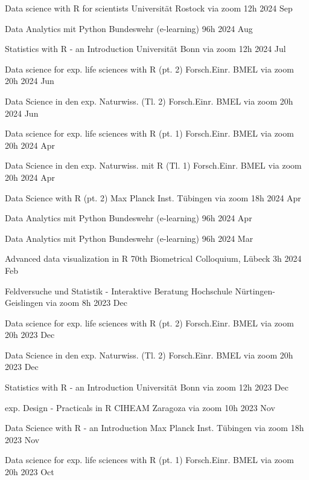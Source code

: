 \documentclass[11pt,a4paper,]{awesome-cv}
\begin{document}
\begin{cvhonors} 
\cvhonor
{Data science with R for scientists  }
{Universität Rostock via zoom}
{12h}
{2024 Sep  }

\cvhonor
{Data Analytics mit Python  }
{Bundeswehr (e-learning)}
{96h}
{2024 Aug  }

\cvhonor
{Statistics with R - an Introduction  }
{Universität Bonn via zoom}
{12h}
{2024 Jul  }

\cvhonor
{Data science for exp. life sciences with R (pt. 2)  }
{Forsch.Einr. BMEL via zoom}
{20h}
{2024 Jun  }

\cvhonor
{Data Science in den exp. Naturwiss. (Tl. 2)  }
{Forsch.Einr. BMEL via zoom}
{20h}
{2024 Jun  }

\cvhonor
{Data science for exp. life sciences with R (pt. 1)  }
{Forsch.Einr. BMEL via zoom}
{20h}
{2024 Apr  }

\cvhonor
{Data Science in den exp. Naturwiss. mit R (Tl. 1)  }
{Forsch.Einr. BMEL via zoom}
{20h}
{2024 Apr  }

\cvhonor
{Data Science with R (pt. 2)  }
{Max Planck Inst. Tübingen via zoom}
{18h}
{2024 Apr  }

\cvhonor
{Data Analytics mit Python  }
{Bundeswehr (e-learning)}
{96h}
{2024 Apr  }

\cvhonor
{Data Analytics mit Python  }
{Bundeswehr (e-learning)}
{96h}
{2024 Mar  }

\cvhonor
{Advanced data visualization in R  }
{70th Biometrical Colloquium, Lübeck}
{3h}
{2024 Feb  }

\cvhonor
{Feldversuche und Statistik - Interaktive Beratung  }
{Hochschule Nürtingen-Geislingen via zoom}
{8h}
{2023 Dec  }

\cvhonor
{Data science for exp. life sciences with R (pt. 2)  }
{Forsch.Einr. BMEL via zoom}
{20h}
{2023 Dec  }

\cvhonor
{Data Science in den exp. Naturwiss. (Tl. 2)  }
{Forsch.Einr. BMEL via zoom}
{20h}
{2023 Dec  }

\cvhonor
{Statistics with R - an Introduction  }
{Universität Bonn via zoom}
{12h}
{2023 Dec  }

\cvhonor
{exp. Design - Practicals in R  }
{CIHEAM Zaragoza via zoom}
{10h}
{2023 Nov  }

\cvhonor
{Data Science with R - an Introduction  }
{Max Planck Inst. Tübingen via zoom}
{18h}
{2023 Nov  }

\cvhonor
{Data science for exp. life sciences with R (pt. 1)  }
{Forsch.Einr. BMEL via zoom}
{20h}
{2023 Oct  }


\end{cvhonors}
\end{document}
